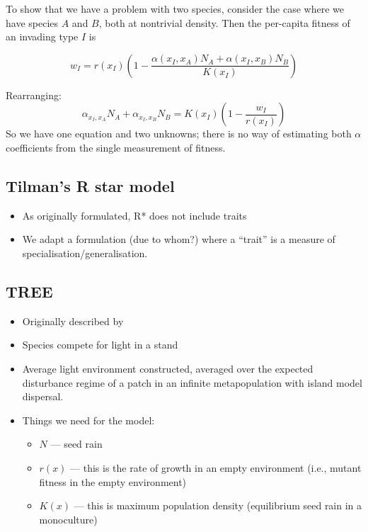 \documentclass[a4paper,11pt]{article}
\begin{document}
To show that we have a problem with two species, consider the case
where we have species $A$ and $B$, both at nontrivial density.  Then
the per-capita fitness of an invading type $I$ is

\begin{equation*}
  w_I = r(x_I)\left(1 - \frac{\alpha(x_I, x_A) N_A + \alpha(x_I, x_B) N_B}{K(x_I)}\right)
\end{equation*}

Rearranging:
\begin{equation*}
  \alpha_{x_I, x_A} N_A + \alpha_{x_I, x_B} N_B =
  K(x_I)\left(1 - \frac{w_I}{r(x_I)}\right)
\end{equation*}
So we have one equation and two unknowns; there is no way of
estimating both $\alpha$ coefficients from the single measurement of
fitness.

\subsection{Tilman's R star model}
\begin{itemize}
\item As originally formulated, R* does not include traits
\item We adapt a formulation (due to whom?) where a ``trait'' is a
  measure of specialisation/generalisation.
\end{itemize}

\subsection{TREE}
\begin{itemize}
\item Originally described by \citet{Falster-2011}
\item Species compete for light in a stand
\item Average light environment constructed, averaged over the
  expected disturbance regime of a patch in an infinite metapopulation
  with island model dispersal.
\item Things we need for the model:
  \begin{itemize}
  \item $N$ --- seed rain
  \item $r(x)$ --- this is the rate of growth in an empty environment
    (i.e., mutant fitness in the empty environment)
  \item $K(x)$ --- this is maximum population density (equilibrium
    seed rain in a monoculture)
  \end{itemize}
\end{itemize}
\end{document}
